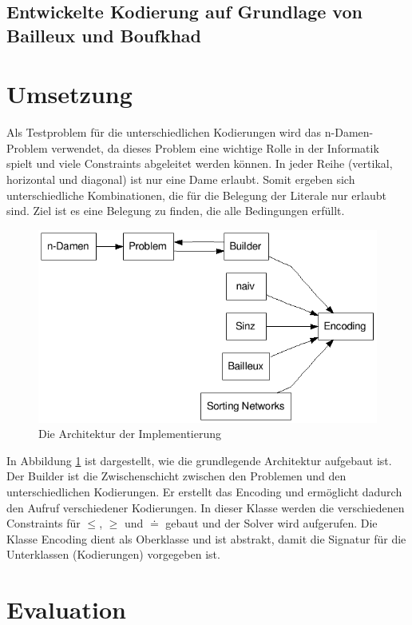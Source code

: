 \documentclass[a4,abstract=on]{scrartcl}
\newcommand*\stdsection{}
\let\stdsection\section
\renewcommand*\section{%
    \clearpage\ifodd\value{page}\else\mbox{}\clearpage\fi
    \stdsection}
\begin{document}
	\subsection{Entwickelte Kodierung auf Grundlage von Bailleux und Boufkhad}

\section{Umsetzung}
 Als Testproblem für die unterschiedlichen Kodierungen wird das n-Damen-Problem verwendet, da dieses Problem eine wichtige Rolle in der Informatik spielt und viele Constraints abgeleitet werden können. In jeder Reihe (vertikal, horizontal und diagonal) ist nur eine Dame erlaubt. Somit ergeben sich unterschiedliche Kombinationen, die für die Belegung der Literale nur erlaubt sind. Ziel ist es eine Belegung zu finden, die alle Bedingungen erfüllt.

\begin{figure}[H]
\centering
\includegraphics[width=\textwidth]{architektur.png}
\caption{Die Architektur der Implementierung}
\label{fig:architektur}
\end{figure}

In Abbildung \ref{fig:architektur} ist dargestellt, wie die grundlegende Architektur aufgebaut ist. 
Der Builder ist die Zwischenschicht zwischen den Problemen und den unterschiedlichen Kodierungen. Er erstellt das Encoding und ermöglicht dadurch den Aufruf verschiedener Kodierungen. In dieser Klasse werden die verschiedenen Constraints für $\leq$, 	$\geq$ und $\doteq$ gebaut und der Solver wird aufgerufen. Die Klasse Encoding dient als Oberklasse und ist abstrakt, damit die Signatur für die Unterklassen (Kodierungen) vorgegeben ist. 

\section{Evaluation}
\end{document}

